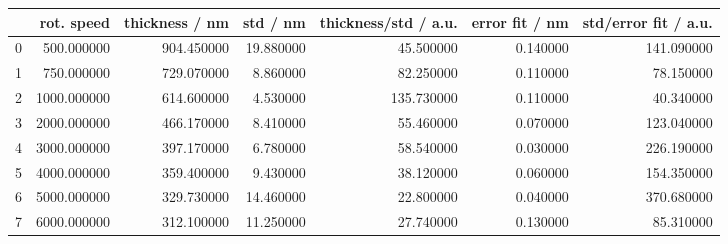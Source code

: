 \begin{tabular}{lrrrrrr}
\toprule
 & rot. speed & thickness / nm & std / nm & thickness/std / a.u. & error fit / nm & std/error fit / a.u. \\
\midrule
0 & 500.000000 & 904.450000 & 19.880000 & 45.500000 & 0.140000 & 141.090000 \\
1 & 750.000000 & 729.070000 & 8.860000 & 82.250000 & 0.110000 & 78.150000 \\
2 & 1000.000000 & 614.600000 & 4.530000 & 135.730000 & 0.110000 & 40.340000 \\
3 & 2000.000000 & 466.170000 & 8.410000 & 55.460000 & 0.070000 & 123.040000 \\
4 & 3000.000000 & 397.170000 & 6.780000 & 58.540000 & 0.030000 & 226.190000 \\
5 & 4000.000000 & 359.400000 & 9.430000 & 38.120000 & 0.060000 & 154.350000 \\
6 & 5000.000000 & 329.730000 & 14.460000 & 22.800000 & 0.040000 & 370.680000 \\
7 & 6000.000000 & 312.100000 & 11.250000 & 27.740000 & 0.130000 & 85.310000 \\
\bottomrule
\end{tabular}
